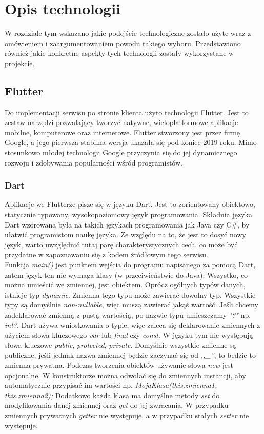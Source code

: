 \chapter{Opis technologii}
\thispagestyle{chapterBeginStyle}

W rozdziale tym wskazano jakie podejście technologiczne zostało użyte wraz z omówieniem i zaargumentowaniem powodu takiego wyboru. Przedstawiono również jakie konkretne aspekty tych technologii zostały wykorzystane w projekcie.

\section{Flutter}

Do implementacji serwisu po stronie klienta użyto technologii Flutter. Jest to zestaw narzędzi pozwalający tworzyć natywne, wieloplatformowe aplikacje mobilne, komputerowe oraz internetowe. Flutter stworzony jest przez firmę Google, a jego pierwsza stabilna wersja ukazała się pod koniec 2019 roku. Mimo stosunkowo młodej technologii Google przyczynia się do jej dynamicznego rozwoju i zdobywania popularności wśród programistów. 

\subsection{Dart}

Aplikacje we Flutterze pisze się w języku Dart. Jest to zorientowany obiektowo, statycznie typowany, wysokopoziomowy język programowania. Składnia języka Dart wzorowana była na takich językach programowania jak Java czy C\#, by ułatwić programistom naukę języka. Ze względu na to, że jest to dosyć nowy język, warto uwzględnić tutaj parę charakterystycznych cech, co może być przydatne w zapoznawaniu się z kodem źródłowym tego serwisu. \\

Funkcja \emph{main()} jest punktem wejścia do programu napisanego za pomocą Dart, zatem język ten nie wymaga klasy (w przeciwieństwie do Java). Wszystko, co można umieścić we zmiennej, jest obiektem. Oprócz ogólnych typów danych, istnieje typ \emph{dynamic}. Zmienna tego typu może zawierać dowolny typ. Wszystkie typy są domyślnie \emph{non-nullable}, więc muszą zawierać jakąś wartość. Jeśli chcemy zadeklarować zmienną z pustą wartością, po nazwie typu umieszczamy \emph{"?"} np. \emph{int?}. Dart używa wnioskowania o typie, więc zaleca się deklarowanie zmiennych z użyciem słowa kluczowego \emph{var} lub \emph{final} czy \emph{const}. W języku tym nie występują słowa kluczowe \emph{public}, \emph{protected}, \emph{private}. Domyślnie wszystkie zmienne są publiczne, jeśli jednak nazwa zmiennej będzie zaczynać się od \emph{,,\_''}, to będzie to zmienna prywatna. Podczas tworzenia obiektów używanie słowa \emph{new} jest opcjonalne. W konstruktorze można odwołać się do zmiennych instancji, aby automatycznie przypisać im wartości np. \emph{MojaKlasa(this.zmienna1, this.zmienna2);} Dodatkowo każda klasa ma domyślne metody \emph{set} do modyfikowania danej zmiennej oraz \emph{get} do jej zwracania. W przypadku zmiennych prywatnych \emph{getter} nie występuje, a w przypadku stałych \emph{setter} nie występuje. \\

